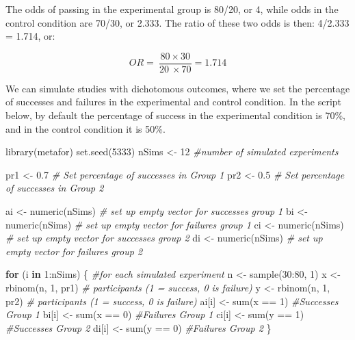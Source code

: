 \documentclass[
  oneside]{book}
\newenvironment{Shaded}{\begin{snugshade}}{\end{snugshade}}
\newcommand{\CommentTok}[1]{\textcolor[rgb]{0.56,0.35,0.01}{\textit{#1}}}
\newcommand{\ControlFlowTok}[1]{\textcolor[rgb]{0.13,0.29,0.53}{\textbf{#1}}}
\newcommand{\DecValTok}[1]{\textcolor[rgb]{0.00,0.00,0.81}{#1}}
\newcommand{\FloatTok}[1]{\textcolor[rgb]{0.00,0.00,0.81}{#1}}
\newcommand{\FunctionTok}[1]{\textcolor[rgb]{0.00,0.00,0.00}{#1}}
\newcommand{\NormalTok}[1]{#1}
\newcommand{\OtherTok}[1]{\textcolor[rgb]{0.56,0.35,0.01}{#1}}
\newcommand{\SpecialCharTok}[1]{\textcolor[rgb]{0.00,0.00,0.00}{#1}}
\begin{document}
The odds of passing in the experimental group is 80/20, or 4, while odds in the control condition are 70/30, or 2.333. The ratio of these two odds is then: 4/2.333 = 1.714, or:

\[
OR = \ \frac{80 \times 30}{20\  \times 70} = 1.714
\]

We can simulate studies with dichotomous outcomes, where we set the percentage of successes and
failures in the experimental and control condition. In the script below, by default the percentage of success in the experimental condition is 70\%, and in the control condition it is 50\%.

\begin{Shaded}
\begin{Highlighting}[]
\FunctionTok{library}\NormalTok{(metafor)}
\FunctionTok{set.seed}\NormalTok{(}\DecValTok{5333}\NormalTok{)}
\NormalTok{nSims }\OtherTok{\textless{}{-}} \DecValTok{12} \CommentTok{\#number of simulated experiments}

\NormalTok{pr1 }\OtherTok{\textless{}{-}} \FloatTok{0.7} \CommentTok{\# Set percentage of successes in Group 1}
\NormalTok{pr2 }\OtherTok{\textless{}{-}} \FloatTok{0.5} \CommentTok{\# Set percentage of successes in Group 2}

\NormalTok{ai }\OtherTok{\textless{}{-}} \FunctionTok{numeric}\NormalTok{(nSims) }\CommentTok{\# set up empty vector for successes group 1}
\NormalTok{bi }\OtherTok{\textless{}{-}} \FunctionTok{numeric}\NormalTok{(nSims) }\CommentTok{\# set up empty vector for failures group 1}
\NormalTok{ci }\OtherTok{\textless{}{-}} \FunctionTok{numeric}\NormalTok{(nSims) }\CommentTok{\# set up empty vector for successes group 2}
\NormalTok{di }\OtherTok{\textless{}{-}} \FunctionTok{numeric}\NormalTok{(nSims) }\CommentTok{\# set up empty vector for failures group 2}

\ControlFlowTok{for}\NormalTok{ (i }\ControlFlowTok{in} \DecValTok{1}\SpecialCharTok{:}\NormalTok{nSims) \{ }\CommentTok{\#for each simulated experiment}
\NormalTok{  n }\OtherTok{\textless{}{-}} \FunctionTok{sample}\NormalTok{(}\DecValTok{30}\SpecialCharTok{:}\DecValTok{80}\NormalTok{, }\DecValTok{1}\NormalTok{)}
\NormalTok{  x }\OtherTok{\textless{}{-}} \FunctionTok{rbinom}\NormalTok{(n, }\DecValTok{1}\NormalTok{, pr1) }\CommentTok{\# participants (1 = success, 0 is failure)}
\NormalTok{  y }\OtherTok{\textless{}{-}} \FunctionTok{rbinom}\NormalTok{(n, }\DecValTok{1}\NormalTok{, pr2) }\CommentTok{\# participants (1 = success, 0 is failure)}
\NormalTok{  ai[i] }\OtherTok{\textless{}{-}} \FunctionTok{sum}\NormalTok{(x }\SpecialCharTok{==} \DecValTok{1}\NormalTok{) }\CommentTok{\#Successes Group 1}
\NormalTok{  bi[i] }\OtherTok{\textless{}{-}} \FunctionTok{sum}\NormalTok{(x }\SpecialCharTok{==} \DecValTok{0}\NormalTok{) }\CommentTok{\#Failures Group 1}
\NormalTok{  ci[i] }\OtherTok{\textless{}{-}} \FunctionTok{sum}\NormalTok{(y }\SpecialCharTok{==} \DecValTok{1}\NormalTok{) }\CommentTok{\#Successes Group 2}
\NormalTok{  di[i] }\OtherTok{\textless{}{-}} \FunctionTok{sum}\NormalTok{(y }\SpecialCharTok{==} \DecValTok{0}\NormalTok{) }\CommentTok{\#Failures Group 2}
\NormalTok{\}}


\end{Highlighting}
\end{Shaded}
\end{document}
